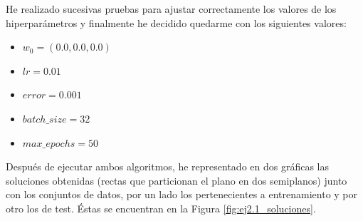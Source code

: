 \documentclass[10pt,a4paper]{article}
\begin{document}
He realizado sucesivas pruebas para ajustar correctamente los valores de los hiperparámetros y finalmente he decidido quedarme con los siguientes valores:

\begin{itemize}
	\item $w_0 = (0.0, 0.0, 0.0)$
	\item $lr = 0.01$
	\item $error = 0.001$
	\item $batch\_size = 32$
	\item $max\_epochs = 50$
\end{itemize}

Después de ejecutar ambos algoritmos, he representado en dos gráficas las soluciones obtenidas (rectas que particionan el plano en dos semiplanos) junto con los conjuntos de datos, por un lado los pertenecientes a entrenamiento y por otro los de test. Éstas se encuentran en la Figura \ref{fig:ej2.1_soluciones}.
\end{document}
